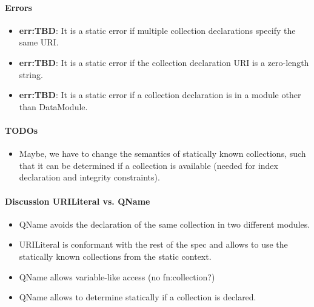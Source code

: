 \documentclass[]{article}
\begin{document}
\vspace{0.5cm}

\paragraph{Errors}
\begin{itemize}
  \item \textbf{err:TBD}: It is a static error if multiple collection declarations specify the same URI.
  \item \textbf{err:TBD}: It is a static error if the collection declaration URI is a zero-length string.
  \item \textbf{err:TBD}: It is a static error if a collection declaration is in a module other than DataModule.
\end{itemize}

\paragraph{TODOs}
\begin{itemize}
  \item Maybe, we have to change the semantics of statically known collections, such that it can be determined if a collection is available (needed for index declaration and integrity constraints).
\end{itemize}

\paragraph{Discussion URILiteral vs. QName}
\begin{itemize}
  \item QName avoids the declaration of the same collection in two different modules.
  \item URILiteral is conformant with the rest of the spec and allows to use the statically known collections from the static context.
  \item QName allows variable-like access (no fn:collection?)
  \item QName allows to determine statically if a collection is declared.
\end{itemize}
\end{document}

